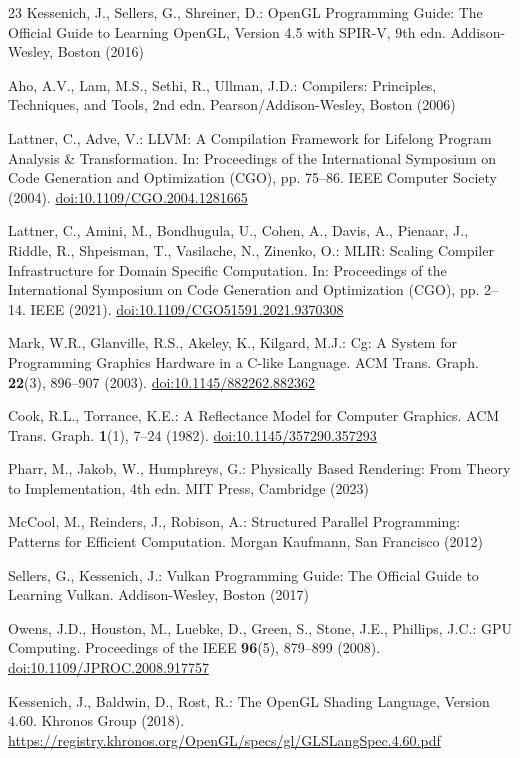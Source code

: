 \documentclass{svproc}
\begin{document}
\begin{thebibliography}{23}
Kessenich, J., Sellers, G., Shreiner, D.: OpenGL Programming Guide: The Official Guide to Learning OpenGL, Version 4.5 with SPIR-V, 9th edn.
Addison-Wesley, Boston (2016)

Aho, A.V., Lam, M.S., Sethi, R., Ullman, J.D.: Compilers: Principles, Techniques, and Tools, 2nd edn.
Pearson/Addison-Wesley, Boston (2006)

Lattner, C., Adve, V.: LLVM: A Compilation Framework for Lifelong Program Analysis \& Transformation.
In: Proceedings of the International Symposium on Code Generation and Optimization (CGO), pp. 75--86.
IEEE Computer Society (2004).
\url{doi:10.1109/CGO.2004.1281665}

Lattner, C., Amini, M., Bondhugula, U., Cohen, A., Davis, A., Pienaar, J., Riddle, R., Shpeisman, T., Vasilache, N., Zinenko, O.: MLIR: Scaling Compiler Infrastructure for Domain Specific Computation.
In: Proceedings of the International Symposium on Code Generation and Optimization (CGO), pp. 2--14.
IEEE (2021).
\url{doi:10.1109/CGO51591.2021.9370308}

Mark, W.R., Glanville, R.S., Akeley, K., Kilgard, M.J.: Cg: A System for Programming Graphics Hardware in a C-like Language.
ACM Trans. Graph. \textbf{22}(3), 896--907 (2003).
\url{doi:10.1145/882262.882362}

Cook, R.L., Torrance, K.E.: A Reflectance Model for Computer Graphics.
ACM Trans. Graph. \textbf{1}(1), 7--24 (1982).
\url{doi:10.1145/357290.357293}

Pharr, M., Jakob, W., Humphreys, G.: Physically Based Rendering: From Theory to Implementation, 4th edn.
MIT Press, Cambridge (2023)

McCool, M., Reinders, J., Robison, A.: Structured Parallel Programming: Patterns for Efficient Computation.
Morgan Kaufmann, San Francisco (2012)

Sellers, G., Kessenich, J.: Vulkan Programming Guide: The Official Guide to Learning Vulkan.
Addison-Wesley, Boston (2017)

Owens, J.D., Houston, M., Luebke, D., Green, S., Stone, J.E., Phillips, J.C.: GPU Computing.
Proceedings of the IEEE \textbf{96}(5), 879--899 (2008).
\url{doi:10.1109/JPROC.2008.917757}

Kessenich, J., Baldwin, D., Rost, R.: The OpenGL Shading Language, Version 4.60.
Khronos Group (2018).
\url{https://registry.khronos.org/OpenGL/specs/gl/GLSLangSpec.4.60.pdf}

\end{thebibliography}
\end{document}
